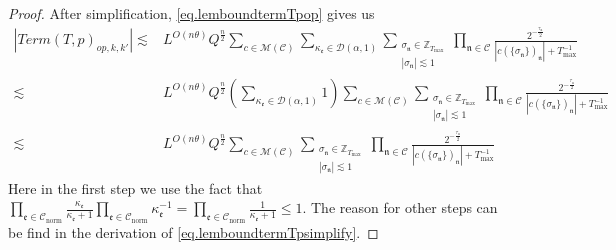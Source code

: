 \begin{proof}
After simplification, \eqref{eq.lemboundtermTpop} gives us 
\begin{equation}
\begin{split}
    |Term(T, p)_{op,k,k'}|\lesssim &L^{O(n\theta)} Q^{\frac{n}{2}}\sum_{c\in \mathscr{M}(\mathcal{C}) }\sum_{\kappa_{\mathfrak{e}}\in \mathcal{D}(\alpha,1)}\sum_{\substack{\sigma_{\mathfrak{n}}\in \mathbb{Z}_{T_{\text{max}}}\\ |\sigma_{\mathfrak{n}}|\lesssim 1}} \prod_{\mathfrak{n}\in \mathcal{C}}\frac{2^{-\frac{\tau_{\mathfrak{n}}}{2}}}{|c(\{\sigma_{\mathfrak{n}}\})_{\mathfrak{n}}|+T^{-1}_{\text{max}}}
    \\
    \lesssim &L^{O(n\theta)} Q^{\frac{n}{2}} \left(\sum_{\kappa_{\mathfrak{e}}\in \mathcal{D}(\alpha,1)} 1\right) \sum_{c\in \mathscr{M}(\mathcal{C})}\sum_{\substack{\sigma_{\mathfrak{n}}\in \mathbb{Z}_{T_{\text{max}}}\\ |\sigma_{\mathfrak{n}}|\lesssim 1}} \prod_{\mathfrak{n}\in \mathcal{C}}\frac{2^{-\frac{\tau_{\mathfrak{n}}}{2}}}{|c(\{\sigma_{\mathfrak{n}}\})_{\mathfrak{n}}|+T^{-1}_{\text{max}}}
    \\
    \lesssim & L^{O(n\theta)} Q^{\frac{n}{2}} \sum_{c\in \mathscr{M}(\mathcal{C})}\sum_{\substack{\sigma_{\mathfrak{n}}\in \mathbb{Z}_{T_{\text{max}}}\\ |\sigma_{\mathfrak{n}}|\lesssim 1}} \prod_{\mathfrak{n}\in \mathcal{C}}\frac{2^{-\frac{\tau_{\mathfrak{n}}}{2}}}{|c(\{\sigma_{\mathfrak{n}}\})_{\mathfrak{n}}|+T^{-1}_{\text{max}}}
\end{split}
\end{equation}
Here in the first step we use the fact that $\prod_{\mathfrak{e}\in \mathcal{C}_{\text{norm}}} \frac{\kappa_{\mathfrak{e}}}{\kappa_{\mathfrak{e}}+1} \prod_{\mathfrak{e}\in \mathcal{C}_{\text{norm}}} \kappa_{\mathfrak{e}}^{-1}=\prod_{\mathfrak{e}\in \mathcal{C}_{\text{norm}}} \frac{1}{\kappa_{\mathfrak{e}}+1}\le 1$. The reason for other steps can be find in the derivation of \eqref{eq.lemboundtermTpsimplify}.


\end{proof}
